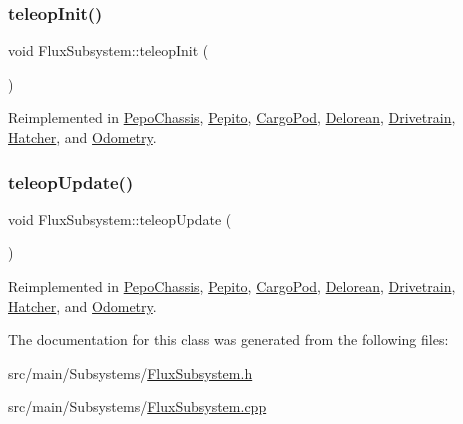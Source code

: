 \mbox{\label{classFluxSubsystem_aec6d05e4f80c3783684598fb92ad2e55}} 
\subsubsection{\texorpdfstring{teleop\+Init()}{teleopInit()}}
{\footnotesize\ttfamily void Flux\+Subsystem\+::teleop\+Init (\begin{DoxyParamCaption}{ }\end{DoxyParamCaption})\hspace{0.3cm}{\ttfamily [virtual]}}



Reimplemented in \hyperlink{classPepoChassis_a44dbc37a56fe98d7b57af840e8da73b2}{Pepo\+Chassis}, \hyperlink{classPepito_a5001bee2d7dcc225c87ac36d5eddc452}{Pepito}, \hyperlink{classCargoPod_a2da82d2620414330cd775ac1c7f0718a}{Cargo\+Pod}, \hyperlink{classDelorean_a789c6e4e70f4e2cfdf944d1a1a149509}{Delorean}, \hyperlink{classDrivetrain_a12d7edbb3a1b5d4ffa4ecb381c1ab115}{Drivetrain}, \hyperlink{classHatcher_ad51238ccec9093e1fa9c63f8f3aafa12}{Hatcher}, and \hyperlink{classOdometry_adea396ff746c1f3ad73ea79d19a75356}{Odometry}.

\mbox{\label{classFluxSubsystem_a327d76affc60699bfa62563e364e42f5}} 
\subsubsection{\texorpdfstring{teleop\+Update()}{teleopUpdate()}}
{\footnotesize\ttfamily void Flux\+Subsystem\+::teleop\+Update (\begin{DoxyParamCaption}{ }\end{DoxyParamCaption})\hspace{0.3cm}{\ttfamily [virtual]}}



Reimplemented in \hyperlink{classPepoChassis_af863b7df039af7051b08c051f744e429}{Pepo\+Chassis}, \hyperlink{classPepito_ac19e921b35d2d76cb5b6a2105b26f568}{Pepito}, \hyperlink{classCargoPod_a29fd74f10b26e3db4348e039969fb173}{Cargo\+Pod}, \hyperlink{classDelorean_a6053dfc106d71fcffa30bac0f5e9b5b8}{Delorean}, \hyperlink{classDrivetrain_a3b6bdf96a9388285c7560b2fedfc7ca1}{Drivetrain}, \hyperlink{classHatcher_a91517b2f54f6c8fc0f27506963a71d20}{Hatcher}, and \hyperlink{classOdometry_ae42a153c786b5c805b073509394951f9}{Odometry}.



The documentation for this class was generated from the following files\+:\begin{DoxyCompactItemize}
\item 
src/main/\+Subsystems/\hyperlink{FluxSubsystem_8h}{Flux\+Subsystem.\+h}\item 
src/main/\+Subsystems/\hyperlink{FluxSubsystem_8cpp}{Flux\+Subsystem.\+cpp}\end{DoxyCompactItemize}
